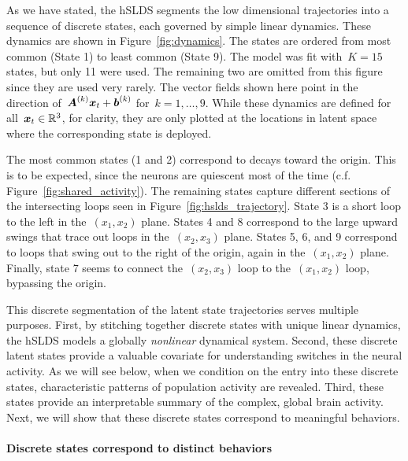 \documentclass{article}
\begin{document}
As we have stated, the hSLDS segments the low dimensional trajectories
into a sequence of discrete states, each governed by simple linear dynamics.
These dynamics are shown in Figure~\ref{fig:dynamics}. The states are ordered
from most common (State 1) to least common (State 9). The model was fit with~$K=15$
states, but only 11 were used. The remaining two are omitted from this figure
since they are used very rarely. The vector fields shown here point in the
direction of~$\boldsymbol{A}^{(k)} \boldsymbol{x}_t + \boldsymbol{b}^{(k)}$ for~$k=1, \ldots, 9$. While these
dynamics are defined for all~$\boldsymbol{x}_t \in \mathbb{R}^3$, for clarity, they are only plotted
at the locations in latent space where the corresponding state is deployed.

The most common states (1 and 2) correspond to decays toward the origin.
This is to be expected, since the neurons are quiescent most of the time
(c.f. Figure~\ref{fig:shared_activity}). The remaining states capture
different sections of the intersecting loops seen in Figure~\ref{fig:hslds_trajectory}.
State 3 is a short loop to the left in the~$(x_1, x_2)$ plane. States 4
and 8 correspond to the large upward swings that trace out loops in the~$(x_2, x_3)$
plane. States 5, 6, and 9 correspond to loops that swing out to the right
of the origin, again in the~$(x_1, x_2)$ plane. Finally, state 7 seems to
connect the~$(x_2, x_3)$ loop to the~$(x_1, x_2)$ loop, bypassing the origin.

This discrete segmentation of the latent state trajectories serves multiple
purposes. First, by stitching together discrete states with unique
linear dynamics, the hSLDS models a globally \emph{nonlinear} dynamical
system.  Second, these discrete latent states provide a valuable covariate
for understanding switches in the neural activity. As we will see below,
when we condition on the entry into these discrete states, characteristic
patterns of population activity are revealed. Third, these states provide
an interpretable summary of the complex, global brain activity. Next, we
will show that these discrete states correspond to meaningful behaviors.

\paragraph{Discrete states correspond to distinct behaviors}
\end{document}
